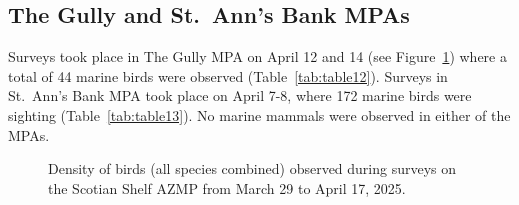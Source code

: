 \documentclass[12pt]{article}\usepackage[]{graphicx}\usepackage[]{color}
\begin{document}
\subsection{The Gully and St.~Ann's Bank MPAs}\label{the-gully-and-st.-anns-bank-mpas}

Surveys took place in The Gully MPA on April 12 and 14 (see Figure~\ref{fig:figure8}) where a total of 44 marine birds were observed (Table~\ref{tab:table12}). Surveys in St.~Ann's Bank MPA took place on April 7-8, where 172 marine birds were sighting (Table~\ref{tab:table13}). No marine mammals were observed in either of the MPAs.

\vspace*{0.2in}


\begin{figure}[H]

{\centering {} 

}

\caption{Density of birds (all species combined) observed during surveys on the Scotian Shelf AZMP from March 29 to April 17, 2025.}\label{fig:figure8}
\end{figure}
\clearpage
\end{document}
